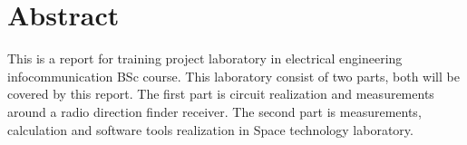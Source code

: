 \documentclass[
11pt, %
a4paper, %
oneside, %
headinclude,footinclude, %
BCOR5mm, %
]{scrartcl}
\title{\normalfont\spacedallcaps{Training Project Laboratory Report}} %
\author{\spacedlowsmallcaps{Qianhao Zhang}} %
\date{} %
\begin{document}

\renewcommand{\sectionmark}[1]{\markright{\spacedlowsmallcaps{#1}}} %
\lehead{\mbox{\llap{\small\thepage\kern1em\color{halfgray} \vline}\color{halfgray}\hspace{0.5em}\rightmark\hfil}} %

\pagestyle{scrheadings} %


\maketitle %

\setcounter{tocdepth}{2} %

\tableofcontents %

\listoffigures %

\listoftables %


\section*{Abstract} %

This is a report for training project laboratory in electrical engineering infocommunication BSc course.
This laboratory consist of two parts, both will be covered by this report.
The first part is circuit realization and measurements around a radio direction 
finder receiver.
The second part is measurements, calculation and software tools realization in Space technology laboratory.
\end{document}
